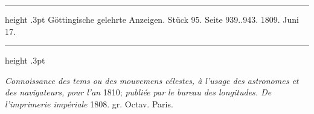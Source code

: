 \par{}\bigskip
\hypertarget{native-522-lower}{}\label{native-522-lower}
\begin{center}
\parbox{.9\linewidth}{%
\centering\small
\hrule height .3pt\relax\vspace{2.5pt}
Göttingische gelehrte Anzeigen. Stück 95. Seite 939..943. 1809. Juni 17.\par
\vspace{2.5pt}\hrule height .3pt\relax
}
\end{center}
\par\nobreak\medskip

\emph{Connoissance des tems ou des mouvemens célestes, à l'usage des astronomes et des navigateurs, pour l'an} 1810; \emph{publiée par le bureau des longitudes. De l'imprimerie impériale} 1808. gr. Octav. Paris.

